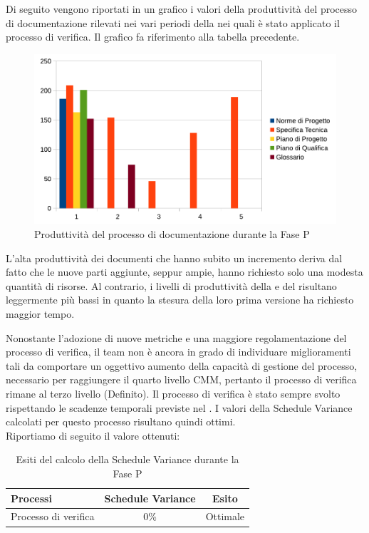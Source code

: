 Di seguito vengono riportati in un grafico i valori della produttività del processo di documentazione rilevati nei vari periodi della  nei quali è stato applicato il processo di verifica. Il grafico fa riferimento alla tabella precedente.\\
\begin{figure}[H]
	\centering
		\includegraphics[width=12cm]{PianoDiQualifica/Pics/ProduttivitaDocumentazioneFaseSD.pdf}
	\caption{Produttività del processo di documentazione durante la Fase P}
\end{figure}
L'alta produttività dei documenti che hanno subito un incremento deriva dal fatto che le nuove parti aggiunte, seppur ampie, hanno richiesto solo una modesta quantità di risorse.
Al contrario, i livelli di produttività della  e del  risultano leggermente più bassi in quanto la stesura della loro prima versione ha richiesto maggior tempo.

	Nonostante l'adozione di nuove metriche e una maggiore regolamentazione del processo di verifica, il team non è ancora in grado di individuare miglioramenti tali da comportare un oggettivo aumento della capacità di gestione del processo, necessario per raggiungere il quarto livello CMM, pertanto il processo di verifica rimane al terzo livello (Definito).
	Il processo di verifica è stato sempre svolto rispettando le scadenze temporali previste nel . I valori della Schedule Variance calcolati per questo processo risultano quindi ottimi.\\
			Riportiamo di seguito il valore ottenuti:
			\begin{table}[H]
				\centering
				\begin{tabu}{| l | c | c |}
					\hline
						Processi 							& Schedule Variance	& Esito		\\ \hline \hline
						Processo di verifica & 0\% & Ottimale \\ \hline
				\end{tabu}
				\caption{Esiti del calcolo della Schedule Variance durante la Fase P}
			\end{table}	


